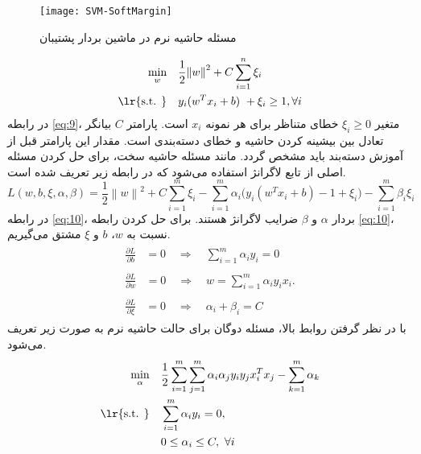 \begin{figure}[!t]
	\centering
	\texttt{[image: SVM-SoftMargin]}
	\caption{مسئله حاشیه نرم در ماشین بردار پشتیبان}
	\label{fig:SVM-SM}
\end{figure}

\begin{equation}
\begin{split}
\min_{w} \quad &\frac{1}{2}{{\left\| w \right\|}^{2}}+C\sum\limits_{i=1}^{n}{{{\xi }_{i}}} \\
\textrm{\lr{s.t. }}  \quad &{{y}_{i}}({{w}^{T}}{{x}_{i}}+b)\text{ }+{{\xi }_{i}}\ge 1,\forall i
\end{split}
\label{eq:9}
\end{equation}
در رابطه \ref{eq:9}، متغیر $\xi _{i}\ge 0$ خطای متناظر برای هر نمونه  $x_i$ است. پارامتر $C$ بیانگر تعادل بین بیشینه کردن حاشیه و خطای دسته‌بندی است. مقدار این پارامتر قبل از آموزش دسته‌بند باید مشخص گردد. مانند مسئله حاشیه سخت، برای حل کردن مسئله اصلی  از تابع لاگرانژ استفاده می‌شود که در رابطه زیر تعریف شده است.
\begin{equation}
L(w,b,\xi, \alpha, \beta )=\frac{1}{2}{{\left\| w \right\|}^{2}} + C\sum\limits_{i=1}^{m}{{{\xi }_{i}}}  -\sum\limits_{i=1}^{m}{{{\alpha }_{i}}({{y}_{i}}({{w}^{T}}{{x}_{i}}+b)-1 + \xi_{i} }) - \sum\limits_{i=1}^{m}{\beta_{i}\xi_{i}}
\label{eq:10}
\end{equation}
در رابطه \ref{eq:10}، بردار $\alpha$  و $\beta$  ضرایب لاگرانژ هستند. برای حل کردن رابطه \ref{eq:10}، نسبت به  $w$، $b$ و $\xi$  مشتق می‌گیریم.
\begin{align}
\label{eq:11}
\begin{split}
\frac{\partial L}{\partial b}&=0\quad \Rightarrow \quad \sum\limits_{i=1}^{m}{{{\alpha }_{i}}{{y}_{i}}}=0
\end{split}\\ 
\label{eq:12}
\begin{split}
\frac{\partial L}{\partial w}&=0 \quad \Rightarrow \quad w = \sum\limits_{i=1}^{m}{\alpha_{i}y_{i}x_{i}}.
\end{split}\\
\label{eq:13}
\begin{split}
\frac{\partial L}{\partial \xi}&=0 \quad \Rightarrow \quad \alpha_{i} + \beta_{i} = C
\end{split}  
\end{align}
با در نظر گرفتن روابط بالا، مسئله دوگان برای حالت حاشیه نرم به صورت زیر تعریف می‌شود.
\begin{equation}
\begin{split} 
\min\limits_{\alpha} \quad &\frac{1}{2}\sum\limits_{i=1}^{m}{\sum\limits_{j=1}^{m}{{{\alpha }_{i}}{{\alpha }_{j}}{{y}_{i}}{{y}_{j}}x_{i}^{T}{{x}_{j}}-\sum\limits_{k=1}^{m}{{{\alpha }_{k}}}}} \\
\textrm{\lr{s.t. }} \quad &\sum\limits_{i=1}^{m}{\alpha_{i}y_{i}}=0, \\
&0 \le \alpha_{i}\le C,\text{ }\forall i
\end{split}
\label{eq:14}
\end{equation}
